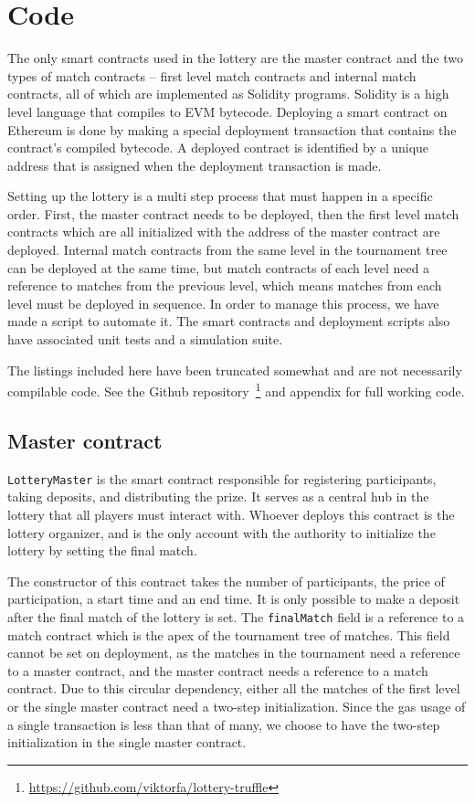 \section{Code}
\label{sec:code}

The only smart contracts used in the lottery are the master contract and the two types of match contracts – first level match contracts and internal match contracts, all of which are implemented as Solidity programs. Solidity is a high level language that compiles to EVM bytecode. Deploying a smart contract on Ethereum is done by making a special deployment transaction that contains the contract's compiled bytecode. A deployed contract is identified by a unique address that is assigned when the deployment transaction is made.

Setting up the lottery is a multi step process that must happen in a specific order. First, the master contract needs to be deployed, then the first level match contracts which are all initialized with the address of the master contract are deployed. Internal match contracts from the same level in the tournament tree can be deployed at the same time, but match contracts of each level need a reference to matches from the previous level, which means matches from each level must be deployed in sequence. In order to manage this process, we have made a script to automate it. The smart contracts and deployment scripts also have associated unit tests and a simulation suite.

The listings included here have been truncated somewhat and are not necessarily compilable code. See the Github repository~\footnote{\url{https://github.com/viktorfa/lottery-truffle}} and appendix for full working code.

\subsection{Master contract}
\texttt{LotteryMaster} is the smart contract responsible for registering participants, taking deposits, and distributing the prize. It serves as a central hub in the lottery that all players must interact with. Whoever deploys this contract is the lottery organizer, and is the only account with the authority to initialize the lottery by setting the final match. 

The constructor of this contract takes the number of participants, the price of participation, a start time and an end time. It is only possible to make a deposit after the final match of the lottery is set. The \texttt{finalMatch} field is a reference to a match contract which is the apex of the tournament tree of matches. This field cannot be set on deployment, as the matches in the tournament need a reference to a master contract, and the master contract needs a reference to a match contract. Due to this circular dependency, either all the matches of the first level or the single master contract need a two-step initialization. Since the gas usage of a single transaction is less than that of many, we choose to have the two-step initialization in the single master contract.

